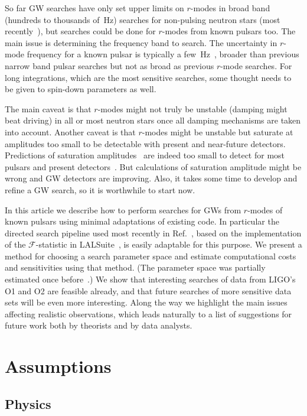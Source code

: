\documentclass{ttuthes2007}
\begin{document}
So far \ac{GW} searches have only set upper limits on $r$-modes in broad band
(hundreds to thousands of~Hz) searches for non-pulsing neutron stars (most
recently~\cite{Abbott:2018qee}), but searches could be done for $r$-modes from
known pulsars too.
The main issue is determining the frequency band to search.
The uncertainty in $r$-mode frequency for a known pulsar is typically a
few~Hz~\cite{Idrisy:2014qca}, broader than previous narrow band pulsar
searches but not as broad as previous $r$-mode searches.
For long integrations, which are the most sensitive searches, some thought
needs to be given to spin-down parameters as well.

The main caveat is that $r$-modes might not truly be unstable (damping might
beat driving) in all or most neutron stars once all damping mechanisms are
taken into account.
Another caveat is that $r$-modes might be unstable but saturate at amplitudes
too small to be detectable with present and near-future detectors.
Predictions of saturation amplitudes~\cite{Arras:2002dw} are indeed too small
to detect for most pulsars and present detectors~\cite{Owen_2010}.
But calculations of saturation amplitude might be wrong and \ac{GW} detectors
are improving.
Also, it takes some time to develop and refine a \ac{GW} search, so it is
worthwhile to start now.

In this article we describe how to perform searches for \acp{GW} from
$r$-modes of known pulsars using minimal adaptations of existing code.
In particular the directed search pipeline used most recently in
Ref.~\cite{Abbott:2018qee}, based on the implementation of the
$\mathcal{F}$-statistic in LALSuite~\cite{LALSuite}, is easily adaptable for
this purpose.
We present a method for choosing a search parameter space and estimate
computational costs and sensitivities using that method.
(The parameter space was partially estimated once before~\cite{Ian}.)
We show that interesting searches of data from LIGO's \ac{O1} and \ac{O2} are
feasible already, and that future searches of more sensitive data sets will be
even more interesting.
Along the way we highlight the main issues affecting realistic observations,
which leads naturally to a list of suggestions for future work both by
theorists and by data analysts.

\section{Assumptions}

\subsection{Physics}
\end{document}
